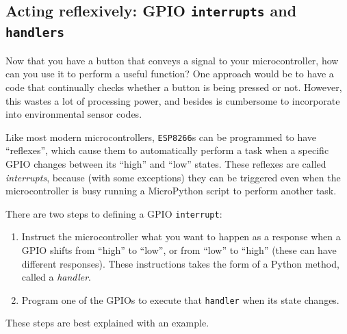 \subsection{Acting reflexively: GPIO \texttt{interrupts} and \texttt{handlers}}
Now that you have a button that conveys a signal to your microcontroller, how can you use it to perform a useful function?
One approach would be to have a code that continually checks whether a button is being pressed or not.
However, this wastes a lot of processing power, and besides is cumbersome to incorporate into environmental sensor codes.

Like most modern microcontrollers, \texttt{ESP8266}s can be programmed to have ``reflexes'', which cause them to automatically perform a task when a specific GPIO changes between its ``high'' and ``low'' states.
These reflexes are called \emph{interrupts}, because (with some exceptions) they can be triggered even when the microcontroller is busy running a MicroPython script to perform another task.

There are two steps to defining a GPIO \texttt{interrupt}:
\begin{enumerate}
	\item Instruct the microcontroller what you want to happen as a response when a GPIO shifts from ``high'' to ``low'', or from ``low'' to ``high'' (these can have different responses).
	These instructions takes the form of a Python method, called a \emph{handler}.

	\item Program one of the GPIOs to execute that \texttt{handler} when its state changes.

\end{enumerate}
These steps are best explained with an example.

